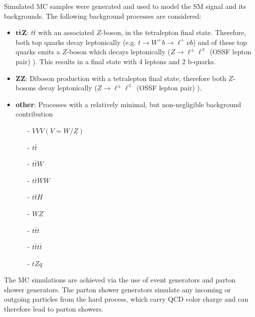 Simulated MC samples were generated and used to model the SM \tWZ signal and its backgrounds. The following background processes are considered:
\begin{itemize}
	\item $\mathbf{t \bar{t} Z}$: $t \bar{t} $  with an associated $Z$-boson, in the tetralepton final state. Therefore, both top quarks decay leptonically (e.g. $t \rightarrow W^+ b \rightarrow \ell^+ \nu b$) and of these top quarks emits a $Z$-boson which decays leptonically ($Z \rightarrow \ell^\pm \ell^\mp$ (OSSF lepton pair) ). This results in a final state with 4 leptons and 2 b-quarks.
	\item $\mathbf{ZZ}$: Diboson production with a tetralepton final state, therefore both $Z$-bosons decay leptonically ($Z \rightarrow \ell^\pm \ell^\mp$ (OSSF lepton pair) ).
	\item \textbf{other}: Processes with a relatively minimal, but non-negligible background contribution
	\begin{itemize}
	\item [-] $VVV (V=W/Z)$
	\item [-] $t\bar{t}$
	\item [-] $t\bar{t}W$
	\item [-] $t\bar{t}WW$
	\item [-] $t\bar{t}H$
	\item [-] $WZ$
	\item [-] $t\bar{t}t$
	\item [-] $t\bar{t}t\bar{t}$
	\item [-] $tZq$
	\end{itemize}
\end{itemize}

The MC simulations are achieved via the use of event generators and parton shower generators. The parton shower generators simulate any incoming or outgoing particles from the hard process, which carry QCD color charge and can therefore lead to parton showers.\\

